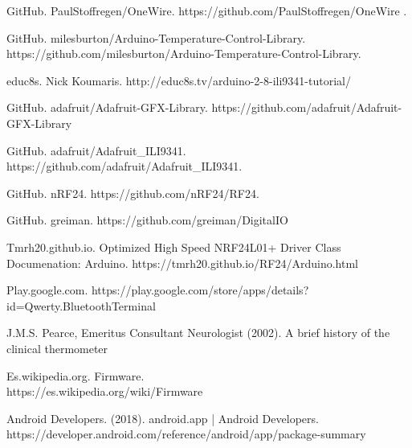 \begin{thebibliography}{9}
GitHub. PaulStoffregen/OneWire. https://github.com/PaulStoffregen/OneWire .

GitHub. milesburton/Arduino-Temperature-Control-Library. https://github.com/milesburton/Arduino-Temperature-Control-Library.

educ8s. Nick Koumaris.
http://educ8s.tv/arduino-2-8-ili9341-tutorial/

GitHub. adafruit/Adafruit-GFX-Library.  https://github.com/adafruit/Adafruit-GFX-Library

GitHub. adafruit/Adafruit\_ILI9341. https://github.com/adafruit/Adafruit\_ILI9341.

GitHub. nRF24. https://github.com/nRF24/RF24.

GitHub. greiman. https://github.com/greiman/DigitalIO

Tmrh20.github.io. Optimized High Speed NRF24L01+ Driver Class Documenation: Arduino. https://tmrh20.github.io/RF24/Arduino.html

Play.google.com. https://play.google.com/store/apps/details?id=Qwerty.BluetoothTerminal

J.M.S. Pearce, 
Emeritus Consultant Neurologist (2002). A brief history of the clinical thermometer

Es.wikipedia.org. Firmware.\\ 
https://es.wikipedia.org/wiki/Firmware

Android Developers. (2018). android.app  |  Android Developers.  https://developer.android.com/reference/android/app/package-summary 

\end{thebibliography}